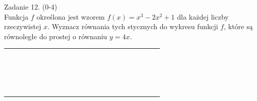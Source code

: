 \documentclass[10pt]{article}
\begin{document}
Zadanie 12. (0-4)\\
Funkcja \(f\) określona jest wzorem \(f(x)=x^{3}-2 x^{2}+1\) dla każdej liczby rzeczywistej \(x\). Wyznacz równania tych stycznych do wykresu funkcji \(f\), które są równoległe do prostej o równaniu \(y=4 x\).

\begin{center}
\begin{tabular}{|c|c|c|c|c|c|c|c|c|c|c|c|c|c|c|c|c|c|c|c|c|c|}
\hline
 &  &  &  &  &  &  &  &  &  &  &  &  &  &  &  &  &  &  &  &  &  \\
\hline
 &  &  &  &  &  &  &  &  &  &  &  &  &  &  &  &  &  &  &  &  &  \\
\hline
 &  &  &  &  &  &  &  &  &  &  &  &  &  &  &  &  &  &  &  &  &  \\
\hline
 &  &  &  &  &  &  &  &  &  &  &  &  &  &  &  &  &  &  &  &  &  \\
\hline
 &  &  &  &  &  &  &  &  &  &  &  &  &  &  &  &  &  &  &  &  &  \\
\hline
 &  &  &  &  &  &  &  &  &  &  &  &  &  &  &  &  &  &  &  &  &  \\
\hline
 &  &  &  &  &  &  &  &  &  &  &  &  &  &  &  &  &  &  &  &  &  \\
\hline
 &  &  &  &  &  &  &  &  &  &  &  &  &  &  &  &  &  &  &  &  &  \\
\hline
 &  &  &  &  &  &  &  &  &  &  &  &  &  &  &  &  &  &  &  &  &  \\
\hline
 &  &  &  &  &  &  &  &  &  &  &  &  &  &  &  &  &  &  &  &  &  \\
\hline
 &  &  &  &  &  &  &  &  &  &  &  &  &  &  &  &  &  &  &  &  &  \\
\hline
 &  &  &  &  &  &  &  &  &  &  &  &  &  &  &  &  &  &  &  &  &  \\
\hline
 &  &  &  &  &  &  &  &  &  &  &  &  &  &  &  &  &  &  &  &  &  \\
\hline
 &  &  &  &  &  &  &  &  &  &  &  &  &  &  &  &  &  &  &  &  &  \\
\hline
 &  &  &  &  &  &  &  &  &  &  &  &  &  &  &  &  &  &  &  &  &  \\
\hline
 &  &  &  &  &  &  &  &  &  &  &  &  &  &  &  &  &  &  &  &  &  \\
\hline
 &  &  &  &  &  &  &  &  &  &  &  &  &  &  &  &  &  &  &  &  &  \\
\hline
 &  &  &  &  &  &  &  &  &  &  &  &  &  &  &  &  &  &  &  &  &  \\
\hline
 &  &  &  &  &  &  &  &  &  &  &  &  &  &  &  &  &  &  &  &  &  \\

\end{tabular}
\end{center}
\end{document}
